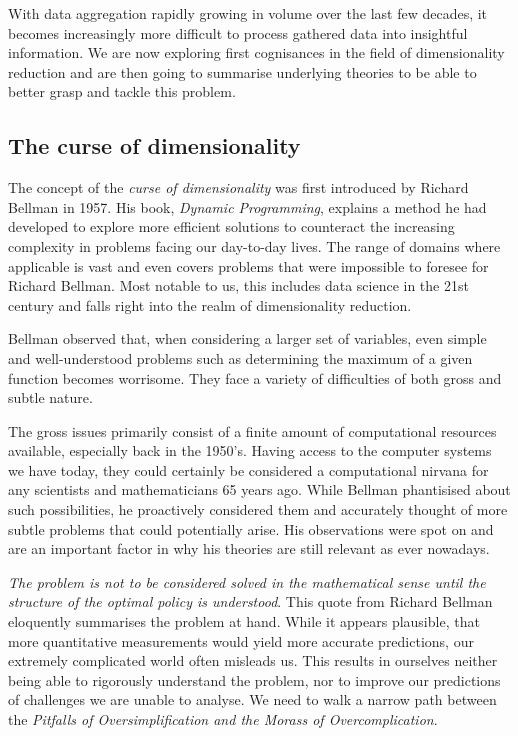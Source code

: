 With data aggregation rapidly growing in volume over the last few decades, it becomes increasingly more difficult to process gathered data into insightful information.
We are now exploring first cognisances in the field of dimensionality reduction and are then going to summarise underlying theories to be able to better grasp and tackle this problem.

\vfill

\subsection{The curse of dimensionality} \label{curseOfDimensionality}

The concept of the \emph{curse of dimensionality} was first introduced by Richard Bellman in 1957. \cite{DynProg}
His book, \emph{Dynamic Programming}, explains a method he had developed to explore more efficient solutions to counteract the increasing complexity in problems facing our day-to-day lives. 
The range of domains where applicable is vast and even covers problems that were impossible to foresee for Richard Bellman.
Most notable to us, this includes data science in the 21st century and falls right into the realm of dimensionality reduction.

Bellman observed that, when considering a larger set of variables, even simple and well-understood problems such as determining the maximum of a given function becomes worrisome.
They face a variety of difficulties of both gross and subtle nature.

The gross issues primarily consist of a finite amount of computational resources available, especially back in the 1950's. 
Having access to the computer systems we have today, they could certainly be considered a computational nirvana for any scientists and mathematicians 65 years ago.
While Bellman phantisised about such possibilities, he proactively considered them and accurately thought of more subtle problems that could potentially arise.
His observations were spot on and are an important factor in why his theories are still relevant as ever nowadays.

\emph{The problem is not to be considered solved in the mathematical sense until the structure of the optimal policy is understood}. \cite{DynProg}
This quote from Richard Bellman eloquently summarises the problem at hand.  
While it appears plausible, that more quantitative measurements would yield more accurate predictions, our extremely complicated world often misleads us.
This results in ourselves neither being able to rigorously understand the problem, nor to improve our predictions of challenges we are unable to analyse.
We need to walk a narrow path between the \emph{Pitfalls of Oversimplification and the Morass of Overcomplication}. \cite{DynProg}

